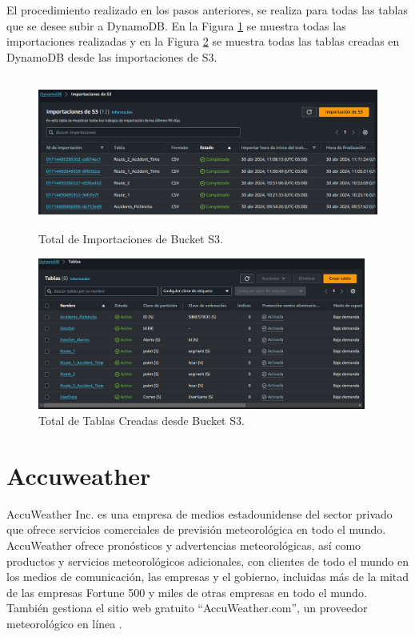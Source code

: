 \documentclass[a4paper,10pt, oneside, titlepage]{article}
\begin{document}
	\indent El procedimiento realizado en los pasos anteriores, se realiza para todas las tablas que se desee subir a DynamoDB. En la Figura \ref{Total_Importaciones_Bucket_S3} se muestra todas las importaciones realizadas y en la Figura \ref{Total_Tablas_Creadas_Bucket_S3} se muestra todas las tablas creadas en DynamoDB desde las importaciones de S3.
	\begin{figure}[!h]
		\centering
		\includegraphics[width = 1\linewidth, height = 5cm]{Total_Importaciones_Bucket_S3.png}
		\caption{Total de Importaciones de Bucket S3.}
		\label{Total_Importaciones_Bucket_S3}
	\end{figure}
	\begin{figure}[!h]
		\centering
		\includegraphics[width = 1\linewidth, height = 5cm]{Total_Tablas_Creadas_Bucket_S3.png}
		\caption{Total de Tablas Creadas desde Bucket S3.}
		\label{Total_Tablas_Creadas_Bucket_S3}
	\end{figure}  
	
	\section{Accuweather}\label{Etiqueta_Accuweather_Inc}
	AccuWeather Inc. es una empresa de medios estadounidense del sector privado que ofrece servicios comerciales de previsión meteorológica en todo el mundo. \\\newline
	\indent AccuWeather ofrece pronósticos y advertencias meteorológicas, así como productos y servicios meteorológicos adicionales, con clientes de todo el mundo en los medios de comunicación, las empresas y el gobierno, incluidas más de la mitad de las empresas Fortune 500 y miles de otras empresas en todo el mundo. También gestiona el sitio web gratuito ``AccuWeather.com'', un proveedor meteorológico en línea \cite{AccuWeather_2}.
	
\end{document}
